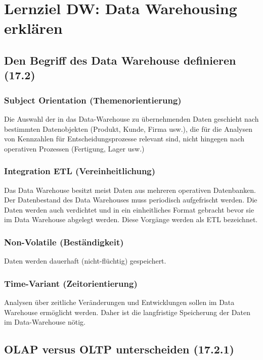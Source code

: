 \section{Lernziel DW: Data Warehousing erklären}

\subsection{Den Begriff des Data Warehouse definieren (17.2)}

\subsubsection{Subject Orientation (Themenorientierung)}

Die Auswahl der in das Data-Warehouse zu übernehmenden Daten geschieht nach bestimmten Datenobjekten (Produkt, Kunde, Firma usw.), die für die Analysen von Kennzahlen für Entscheidungsprozesse relevant sind, nicht hingegen nach operativen Prozessen (Fertigung, Lager usw.)

\subsubsection{Integration ETL (Vereinheitlichung)}

Das Data Warehouse besitzt meist Daten aus mehreren operativen Datenbanken. Der Datenbestand des Data Warehouses muss periodisch aufgefrischt werden. Die Daten werden auch verdichtet und in ein einheitliches Format gebracht bevor sie im Data Warehouse abgelegt werden. Diese Vorgänge werden als \ac{ETL} bezeichnet.

\subsubsection{Non-Volatile (Beständigkeit)}

Daten werden dauerhaft (nicht-flüchtig) gespeichert.

\subsubsection{Time-Variant (Zeitorientierung)}

Analysen über zeitliche Veränderungen und Entwicklungen sollen im Data Warehouse ermöglicht werden. Daher ist die langfristige Speicherung der Daten im Data-Warehouse nötig.

\subsection{OLAP versus OLTP unterscheiden (17.2.1)}

